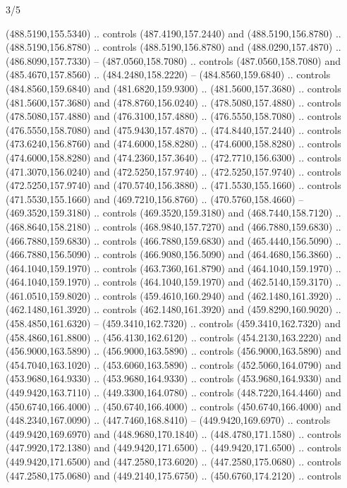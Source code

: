 \begin{flagdescription}{3/5}
\begin{scope}[shift={(0.5\flaglength,0.5\flagwidth)},scale=\flagwidth/510]
\begin{scope}[y=0.80pt, x=0.80pt, yscale=-1.06, xscale=1.06,yshift=-240pt,xshift=-400pt]
\begin{scope}[cm={{0.83333,0.0,0.0,0.83333,(154.64672,48.64761)}}]
\begin{scope}[cm={{0.93334,0.0,0.0,0.93334,(-4.86471,22.64035)}}]
  (488.5190,155.5340) .. controls (487.4190,157.2440) and (488.5190,156.8780) ..
  (488.5190,156.8780) .. controls (488.5190,156.8780) and (488.0290,157.4870) ..
  (486.8090,157.7330) -- (487.0560,158.7080) .. controls (487.0560,158.7080) and
  (485.4670,157.8560) .. (484.2480,158.2220) -- (484.8560,159.6840) .. controls
  (484.8560,159.6840) and (481.6820,159.9300) .. (481.5600,157.3680) .. controls
  (481.5600,157.3680) and (478.8760,156.0240) .. (478.5080,157.4880) .. controls
  (478.5080,157.4880) and (476.3100,157.4880) .. (476.5550,158.7080) .. controls
  (476.5550,158.7080) and (475.9430,157.4870) .. (474.8440,157.2440) .. controls
  (473.6240,156.8760) and (474.6000,158.8280) .. (474.6000,158.8280) .. controls
  (474.6000,158.8280) and (474.2360,157.3640) .. (472.7710,156.6300) .. controls
  (471.3070,156.0240) and (472.5250,157.9740) .. (472.5250,157.9740) .. controls
  (472.5250,157.9740) and (470.5740,156.3880) .. (471.5530,155.1660) .. controls
  (471.5530,155.1660) and (469.7210,156.8760) .. (470.5760,158.4660) --
  (469.3520,159.3180) .. controls (469.3520,159.3180) and (468.7440,158.7120) ..
  (468.8640,158.2180) .. controls (468.9840,157.7270) and (466.7880,159.6830) ..
  (466.7880,159.6830) .. controls (466.7880,159.6830) and (465.4440,156.5090) ..
  (466.7880,156.5090) .. controls (466.9080,156.5090) and (464.4680,156.3860) ..
  (464.1040,159.1970) .. controls (463.7360,161.8790) and (464.1040,159.1970) ..
  (464.1040,159.1970) .. controls (464.1040,159.1970) and (462.5140,159.3170) ..
  (461.0510,159.8020) .. controls (459.4610,160.2940) and (462.1480,161.3920) ..
  (462.1480,161.3920) .. controls (462.1480,161.3920) and (459.8290,160.9020) ..
  (458.4850,161.6320) -- (459.3410,162.7320) .. controls (459.3410,162.7320) and
  (458.4860,161.8800) .. (456.4130,162.6120) .. controls (454.2130,163.2220) and
  (456.9000,163.5890) .. (456.9000,163.5890) .. controls (456.9000,163.5890) and
  (454.7040,163.1020) .. (453.6060,163.5890) .. controls (452.5060,164.0790) and
  (453.9680,164.9330) .. (453.9680,164.9330) .. controls (453.9680,164.9330) and
  (449.9420,163.7110) .. (449.3300,164.0780) .. controls (448.7220,164.4460) and
  (450.6740,166.4000) .. (450.6740,166.4000) .. controls (450.6740,166.4000) and
  (448.2340,167.0090) .. (447.7460,168.8410) -- (449.9420,169.6970) .. controls
  (449.9420,169.6970) and (448.9680,170.1840) .. (448.4780,171.1580) .. controls
  (447.9920,172.1380) and (449.9420,171.6500) .. (449.9420,171.6500) .. controls
  (449.9420,171.6500) and (447.2580,173.6020) .. (447.2580,175.0680) .. controls
  (447.2580,175.0680) and (449.2140,175.6750) .. (450.6760,174.2120) .. controls

\end{scope}
\end{scope}
\end{scope}
\end{scope}
\end{flagdescription}
